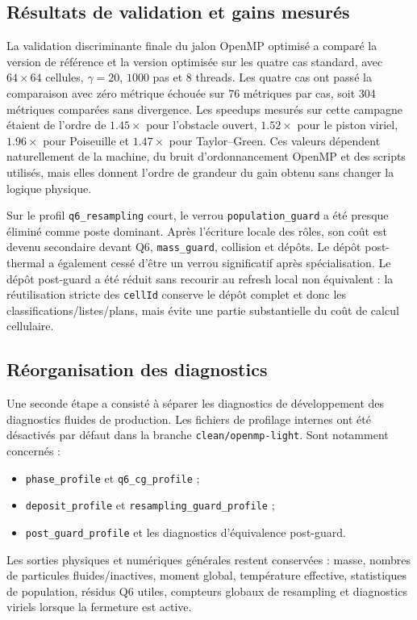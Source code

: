 \documentclass[11pt,a4paper]{article}
\begin{document}
\subsection{Résultats de validation et gains mesurés}

La validation discriminante finale du jalon OpenMP optimisé a comparé la version de référence et la version optimisée sur les quatre cas standard, avec \(64\times64\) cellules, \(\gamma=20\), \(1000\) pas et \(8\) threads. Les quatre cas ont passé la comparaison avec zéro métrique échouée sur 76 métriques par cas, soit 304 métriques comparées sans divergence. Les speedups mesurés sur cette campagne étaient de l'ordre de \(1.45\times\) pour l'obstacle ouvert, \(1.52\times\) pour le piston viriel, \(1.96\times\) pour Poiseuille et \(1.47\times\) pour Taylor--Green. Ces valeurs dépendent naturellement de la machine, du bruit d'ordonnancement OpenMP et des scripts utilisés, mais elles donnent l'ordre de grandeur du gain obtenu sans changer la logique physique.

Sur le profil \texttt{q6\_resampling} court, le verrou \texttt{population\_guard} a été presque éliminé comme poste dominant. Après l'écriture locale des rôles, son coût est devenu secondaire devant Q6, \texttt{mass\_guard}, collision et dépôts. Le dépôt post-thermal a également cessé d'être un verrou significatif après spécialisation. Le dépôt post-guard a été réduit sans recourir au refresh local non équivalent : la réutilisation stricte des \texttt{cellId} conserve le dépôt complet et donc les classifications/listes/plans, mais évite une partie substantielle du coût de calcul cellulaire.

\subsection{Réorganisation des diagnostics}

Une seconde étape a consisté à séparer les diagnostics de développement des diagnostics fluides de production. Les fichiers de profilage internes ont été désactivés par défaut dans la branche \texttt{clean/openmp-light}. Sont notamment concernés :
\begin{itemize}[nosep]
  \item \texttt{phase\_profile} et \texttt{q6\_cg\_profile} ;
  \item \texttt{deposit\_profile} et \texttt{resampling\_guard\_profile} ;
  \item \texttt{post\_guard\_profile} et les diagnostics d'équivalence post-guard.
\end{itemize}
 Les sorties physiques et numériques générales restent conservées : masse, nombres de particules fluides/inactives, moment global, température effective, statistiques de population, résidus Q6 utiles, compteurs globaux de resampling et diagnostics viriels lorsque la fermeture est active.
\end{document}

